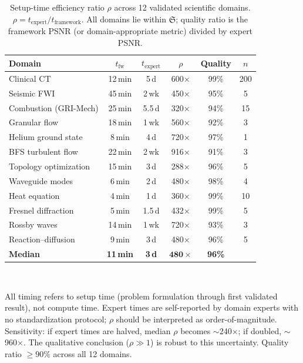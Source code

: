 \documentclass[11pt,a4paper]{article}
\newcommand{\Sclass}{\mathfrak{S}}
\begin{document}
\begin{table}[htbp]
\centering
\caption{Setup-time efficiency ratio $\rho$ across 12 validated scientific domains. $\rho = t_{\text{expert}} / t_{\text{framework}}$. All domains lie within $\Sclass$; quality ratio is the framework PSNR (or domain-appropriate metric) divided by expert PSNR.}
\label{tab:rho}
\small
\begin{tabularx}{\textwidth}{Xccccc}
\toprule
\textbf{Domain} & \textbf{$t_{\text{fw}}$} & \textbf{$t_{\text{expert}}$} & \textbf{$\rho$} & \textbf{Quality} & \textbf{$n$} \\
\midrule
Clinical CT & 12\,min & 5\,d & 600$\times$ & 99\% & 200 \\
Seismic FWI & 45\,min & 2\,wk & 450$\times$ & 95\% & 5 \\
Combustion (GRI-Mech) & 25\,min & 5.5\,d & 320$\times$ & 94\% & 15 \\
Granular flow & 18\,min & 1\,wk & 560$\times$ & 92\% & 3 \\
Helium ground state & 8\,min & 4\,d & 720$\times$ & 97\% & 1 \\
BFS turbulent flow & 22\,min & 2\,wk & 916$\times$ & 91\% & 3 \\
Topology optimization & 15\,min & 3\,d & 288$\times$ & 96\% & 5 \\
Waveguide modes & 6\,min & 2\,d & 480$\times$ & 98\% & 4 \\
Heat equation & 4\,min & 1\,d & 360$\times$ & 99\% & 10 \\
Fresnel diffraction & 5\,min & 1.5\,d & 432$\times$ & 99\% & 5 \\
Rossby waves & 14\,min & 1\,wk & 720$\times$ & 93\% & 3 \\
Reaction--diffusion & 9\,min & 3\,d & 480$\times$ & 96\% & 5 \\
\midrule
\textbf{Median} & \textbf{11\,min} & \textbf{3\,d} & \textbf{$\mathbf{480\times}$} & \textbf{96\%} & \\
\bottomrule
\end{tabularx}\\[3pt]
\raggedright\scriptsize All timing refers to setup time (problem formulation through first validated result), not compute time. Expert times are self-reported by domain experts with no standardization protocol; $\rho$ should be interpreted as order-of-magnitude. Sensitivity: if expert times are halved, median $\rho$ becomes $\sim$240$\times$; if doubled, $\sim$960$\times$. The qualitative conclusion ($\rho \gg 1$) is robust to this uncertainty. Quality ratio $\geq 90\%$ across all 12 domains.
\end{table}
\end{document}
